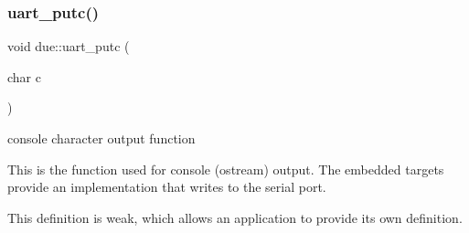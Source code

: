 \subsubsection{\texorpdfstring{uart\+\_\+putc()}{uart\_putc()}}
{\footnotesize\ttfamily void due\+::uart\+\_\+putc (\begin{DoxyParamCaption}\item[{char}]{c }\end{DoxyParamCaption})}

console character output function

This is the function used for console (ostream) output. The embedded targets provide an implementation that writes to the serial port.

This definition is weak, which allows an application to provide its own definition. 